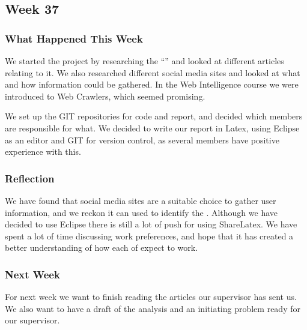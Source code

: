 \subsection{Week 37}
\subsubsection{What Happened This Week}
We started the project by researching the ``\fb'' and looked at different
articles relating to it. We also researched different social media sites and
looked at what and how information could be gathered. In the Web Intelligence
course we were introduced to Web Crawlers, which seemed promising.\nl

We set up the GIT repositories for code and report, and decided which members
are responsible for what. We decided to write our report in Latex, using
Eclipse as an editor and GIT for version control, as several members have
positive experience with this.

\subsubsection{Reflection}
We have found that social media sites are a suitable choice to gather user
information, and we reckon it can used to identify the \fb. Although we have
decided to use Eclipse there is still a lot of push for using ShareLatex.
We have spent a lot of time discussing work preferences, and hope that it has
created a better understanding of how each of expect to work.

\subsubsection{Next Week}
For next week we want to finish reading the articles our supervisor has sent us.
We also want to have a draft of the analysis and an initiating problem ready for our
supervisor.